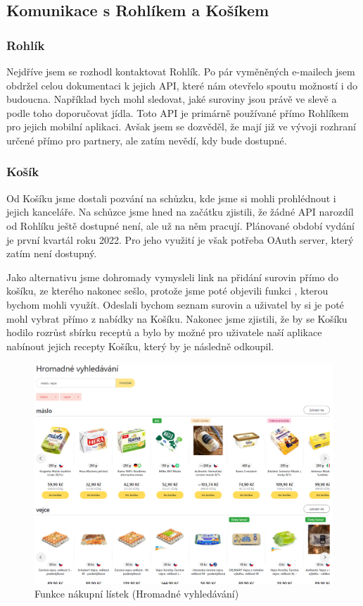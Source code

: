 \subsection{Komunikace s Rohlíkem a Košíkem}

\subsubsection{Rohlík}
Nejdříve jsem se rozhodl kontaktovat Rohlík. Po pár vyměněných e-mailech jsem obdržel celou dokumentaci k jejich API,
které nám otevřelo spoutu možností i do budoucna. Například bych mohl sledovat, jaké suroviny jsou právě ve slevě a
podle toho doporučovat jídla. Toto API je primárně používané přímo Rohlíkem pro jejich mobilní aplikaci. Avšak jsem se
dozvěděl, že mají již ve vývoji rozhraní určené přímo pro partnery, ale zatím nevědí, kdy bude dostupné.

\subsubsection{Košík}
Od Košíku jsme dostali pozvání na schůzku, kde jsme si mohli prohlédnout i jejich kanceláře. Na schůzce jsme hned na začátku
zjistili, že žádné API narozdíl od Rohlíku ještě dostupné není, ale už na něm pracují. Plánované období vydání je
první kvartál roku 2022. Pro jeho využití je však potřeba OAuth server, který zatím není dostupný.

Jako alternativu jsme dohromady vymysleli link na přidání surovin přímo do košíku, ze kterého nakonec sešlo, protože jsme
poté objevili funkci , kterou bychom mohli využít. Odeslali bychom seznam surovin a uživatel by si je poté
mohl vybrat přímo z nabídky na Košíku. Nakonec jsme zjistili, že by se Košíku hodilo rozrůst sbírku receptů a bylo by možné
pro uživatele naší aplikace nabínout jejich recepty Košíku, který by je následně odkoupil.

\begin{figure}[H]
    \includegraphics[width=\textwidth]{images/kosik-nakupni-listek}
    \caption{Funkce nákupní lístek (Hromadné vyhledávání)} \label{picture:kosik:nakupni-listek}
\end{figure}

